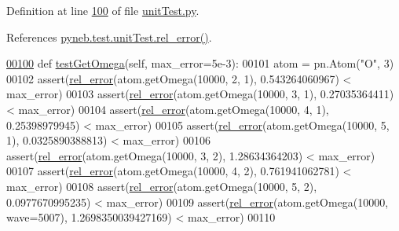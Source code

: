 Definition at line \hyperlink{unit_test_8py_source_l00100}{100} of file \hyperlink{unit_test_8py_source}{unit\+Test.\+py}.



References \hyperlink{unit_test_8py_source_l00005}{pyneb.\+test.\+unit\+Test.\+rel\+\_\+error()}.


\begin{DoxyCode}
\hypertarget{classpyneb_1_1test_1_1unit_test_1_1_unit_test_l00100}{}\hyperlink{classpyneb_1_1test_1_1unit_test_1_1_unit_test_a75cb0860a7a06b129a1028ca635eacf6}{00100}         \textcolor{keyword}{def }\hyperlink{classpyneb_1_1test_1_1unit_test_1_1_unit_test_a75cb0860a7a06b129a1028ca635eacf6}{testGetOmega}(self, max\_error=5e-3):
00101                 atom = pn.Atom(\textcolor{stringliteral}{"O"}, 3)
00102                 assert(\hyperlink{namespacepyneb_1_1test_1_1unit_test_aff3b7f847905c444d8b10727f10de236}{rel\_error}(atom.getOmega(10000, 2, 1), 0.543264060967) < max\_error)
00103                 assert(\hyperlink{namespacepyneb_1_1test_1_1unit_test_aff3b7f847905c444d8b10727f10de236}{rel\_error}(atom.getOmega(10000, 3, 1), 0.27035364411) < max\_error)
00104                 assert(\hyperlink{namespacepyneb_1_1test_1_1unit_test_aff3b7f847905c444d8b10727f10de236}{rel\_error}(atom.getOmega(10000, 4, 1), 0.25398979945) < max\_error)
00105                 assert(\hyperlink{namespacepyneb_1_1test_1_1unit_test_aff3b7f847905c444d8b10727f10de236}{rel\_error}(atom.getOmega(10000, 5, 1), 0.0325890388813) < max\_error)
00106                 assert(\hyperlink{namespacepyneb_1_1test_1_1unit_test_aff3b7f847905c444d8b10727f10de236}{rel\_error}(atom.getOmega(10000, 3, 2), 1.28634364203) < max\_error)
00107                 assert(\hyperlink{namespacepyneb_1_1test_1_1unit_test_aff3b7f847905c444d8b10727f10de236}{rel\_error}(atom.getOmega(10000, 4, 2), 0.761941062781) < max\_error)
00108                 assert(\hyperlink{namespacepyneb_1_1test_1_1unit_test_aff3b7f847905c444d8b10727f10de236}{rel\_error}(atom.getOmega(10000, 5, 2), 0.0977670995235) < max\_error)
00109                 assert(\hyperlink{namespacepyneb_1_1test_1_1unit_test_aff3b7f847905c444d8b10727f10de236}{rel\_error}(atom.getOmega(10000, wave=5007), 1.2698350039427169) < max\_error)
00110                 
\end{DoxyCode}
\hypertarget{classpyneb_1_1test_1_1unit_test_1_1_unit_test_a8340dae4a77382c9c82c1ce67209d47a}{}
